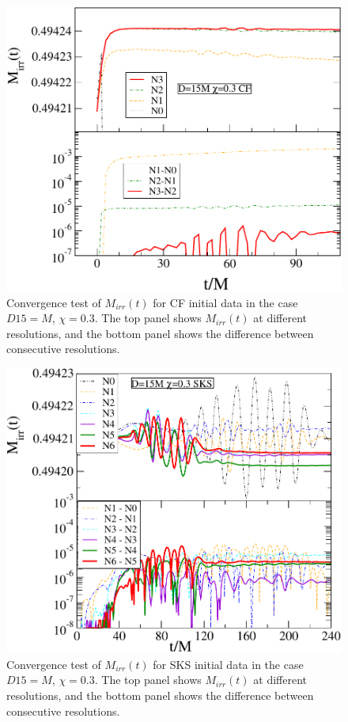 \begin{figure}
 \includegraphics[scale=0.95]{chap5/CFMConvergence1}
  \caption[Convergence of $M_{\rm irr})(t)$ for CF initial data.]{Convergence test of $M_{irr}(t)$ for CF initial data in the
  case $D15=M$, $\chi=0.3$. The top panel shows $M_{irr}(t)$ at
  different resolutions, and the bottom panel shows the difference
  between consecutive resolutions.}
  \label{fig:CFMConvergence1}
\end{figure}

\begin{figure}[!htbp]
 \includegraphics[scale=0.95]{chap5/SKSMConvergence1}
  \caption[Convergence of $M_{\rm irr})(t)$ for SKS initial
  data.]{Convergence test of $M_{irr}(t)$ for SKS initial data in the
  case $D15=M$, $\chi=0.3$. The top panel shows $M_{irr}(t)$ at
  different resolutions, and the bottom panel shows the difference
  between consecutive resolutions.}

  \label{fig:SKSMConvergence1}
\end{figure}

